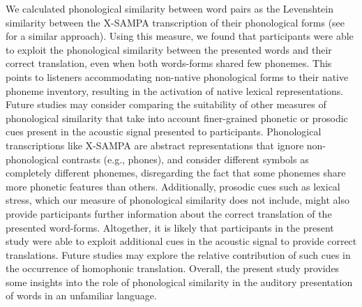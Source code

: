 \documentclass[
]{article}
\begin{document}
We calculated phonological similarity between word pairs as the
Levenshtein similarity between the X-SAMPA transcription of their
phonological forms (see  for a similar approach). Using this measure, we found that
participants were able to exploit the phonological similarity between
the presented words and their correct translation, even when both
words-forms shared few phonemes. This points to listeners accommodating
non-native phonological forms to their native phoneme inventory,
resulting in the activation of native lexical representations. Future
studies may consider comparing the suitability of other measures of
phonological similarity that take into account finer-grained phonetic or
prosodic cues present in the acoustic signal presented to participants.
Phonological transcriptions like X-SAMPA are abstract representations
that ignore non-phonological contrasts (e.g., phones), and consider
different symbols as completely different phonemes, disregarding the
fact that some phonemes share more phonetic features than others.
Additionally, prosodic cues such as lexical stress, which our measure of
phonological similarity does not include, might also provide
participants further information about the correct translation of the
presented word-forms. Altogether, it is likely that participants in the
present study were able to exploit additional cues in the acoustic
signal to provide correct translations. Future studies may explore the
relative contribution of such cues in the occurrence of homophonic
translation. Overall, the present study provides some insights into the
role of phonological similarity in the auditory presentation of words in
an unfamiliar language.
\end{document}

